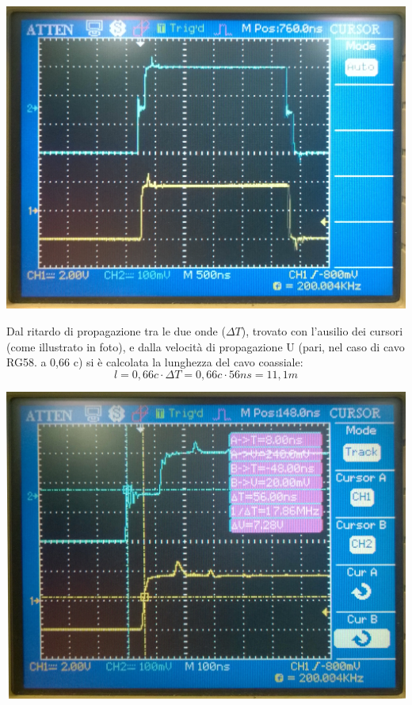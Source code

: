 \documentclass[a4paper]{article}
\begin{document}
\begin{itemize}
\begin{itemize}
\begin{center}
\includegraphics[scale=0.09]{foto/foto11.jpg}
\end{center}

Dal ritardo di propagazione tra le due onde (\(\Delta T\)), trovato con l'ausilio dei cursori (come illustrato in foto), e dalla velocità di propagazione U (pari, nel caso di cavo RG58. a 0,66 c) si è calcolata la lunghezza del cavo coassiale: \[l=0,66c \cdot \Delta T=0,66c\cdot56ns=11,1 m\]

\begin{center}
\includegraphics[scale=0.09]{foto/foto12.jpg}
\end{center}


\end{itemize}
\end{itemize}
\end{document}
